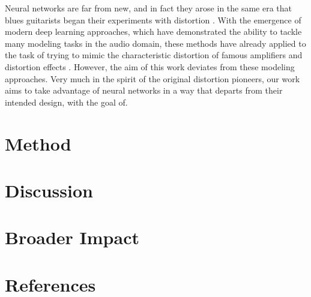 \documentclass{article}
\begin{document}
Neural networks are far from new, and in fact they arose in the same era that blues guitarists began their experiments with distortion \cite{schmidhuber2015deep}.
With the emergence of modern deep learning approaches, which have demonstrated the ability to tackle many modeling tasks in the audio domain,
these methods have already applied to the task of trying to mimic the characteristic distortion of famous amplifiers and distortion effects 
\cite{covert2013rnn, schmitz2018nonlinear, zhang2018lstm, damskagg2019distortion, martinez2019nonlinear}.
However, the aim of this work deviates from these modeling approaches.
Very much in the spirit of the original distortion pioneers, 
our work aims to take advantage of neural networks in a way that departs from their intended design, 
with the goal of. 

\cite{deman2014adaptive}
 

\section{Method}

\section{Discussion}

\section*{Broader Impact}

\section*{References}

{}

\end{document}
